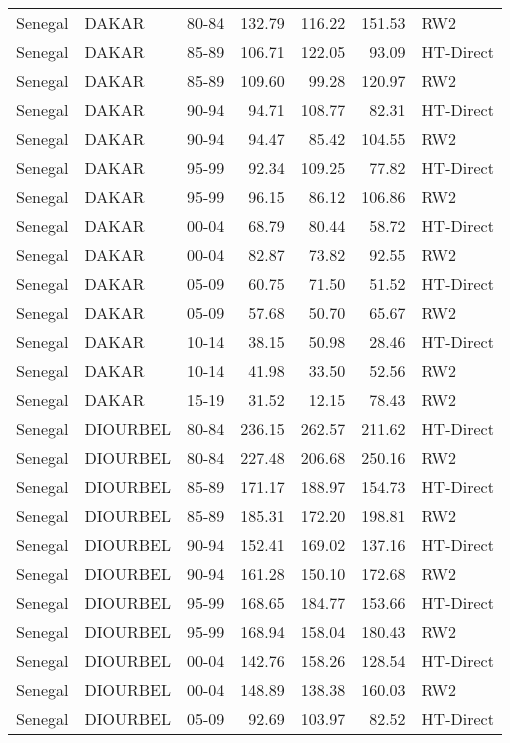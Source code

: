 \begin{longtable}{lllrrrl}
  Senegal & DAKAR & 80-84 & 132.79 & 116.22 & 151.53 & RW2 \\ 
  Senegal & DAKAR & 85-89 & 106.71 & 122.05 & 93.09 & HT-Direct \\ 
  Senegal & DAKAR & 85-89 & 109.60 & 99.28 & 120.97 & RW2 \\ 
  Senegal & DAKAR & 90-94 & 94.71 & 108.77 & 82.31 & HT-Direct \\ 
  Senegal & DAKAR & 90-94 & 94.47 & 85.42 & 104.55 & RW2 \\ 
  Senegal & DAKAR & 95-99 & 92.34 & 109.25 & 77.82 & HT-Direct \\ 
  Senegal & DAKAR & 95-99 & 96.15 & 86.12 & 106.86 & RW2 \\ 
  Senegal & DAKAR & 00-04 & 68.79 & 80.44 & 58.72 & HT-Direct \\ 
  Senegal & DAKAR & 00-04 & 82.87 & 73.82 & 92.55 & RW2 \\ 
  Senegal & DAKAR & 05-09 & 60.75 & 71.50 & 51.52 & HT-Direct \\ 
  Senegal & DAKAR & 05-09 & 57.68 & 50.70 & 65.67 & RW2 \\ 
  Senegal & DAKAR & 10-14 & 38.15 & 50.98 & 28.46 & HT-Direct \\ 
  Senegal & DAKAR & 10-14 & 41.98 & 33.50 & 52.56 & RW2 \\ 
  Senegal & DAKAR & 15-19 & 31.52 & 12.15 & 78.43 & RW2 \\ 
  Senegal & DIOURBEL & 80-84 & 236.15 & 262.57 & 211.62 & HT-Direct \\ 
  Senegal & DIOURBEL & 80-84 & 227.48 & 206.68 & 250.16 & RW2 \\ 
  Senegal & DIOURBEL & 85-89 & 171.17 & 188.97 & 154.73 & HT-Direct \\ 
  Senegal & DIOURBEL & 85-89 & 185.31 & 172.20 & 198.81 & RW2 \\ 
  Senegal & DIOURBEL & 90-94 & 152.41 & 169.02 & 137.16 & HT-Direct \\ 
  Senegal & DIOURBEL & 90-94 & 161.28 & 150.10 & 172.68 & RW2 \\ 
  Senegal & DIOURBEL & 95-99 & 168.65 & 184.77 & 153.66 & HT-Direct \\ 
  Senegal & DIOURBEL & 95-99 & 168.94 & 158.04 & 180.43 & RW2 \\ 
  Senegal & DIOURBEL & 00-04 & 142.76 & 158.26 & 128.54 & HT-Direct \\ 
  Senegal & DIOURBEL & 00-04 & 148.89 & 138.38 & 160.03 & RW2 \\ 
  Senegal & DIOURBEL & 05-09 & 92.69 & 103.97 & 82.52 & HT-Direct \\ 

\end{longtable}
